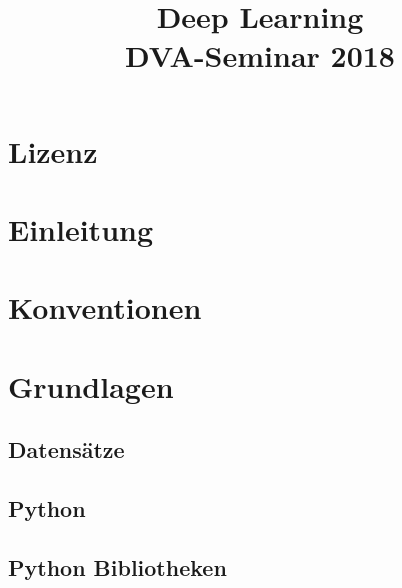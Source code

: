 \documentclass[conference, german]{IEEEtran}
\begin{document}
\title{Deep Learning\\
{\footnotesize DVA-Seminar 2018}
}
\author{
}

\maketitle
\renewcommand{\abstractname}{Zusammenfassung}
\begin{abstract}
\end{abstract}

\section{Lizenz}
\section{Einleitung} 
\section{Konventionen}
\section{Grundlagen}
\subsection{Datensätze}
\subsection{Python}
\subsection{Python Bibliotheken}
\end{document}
